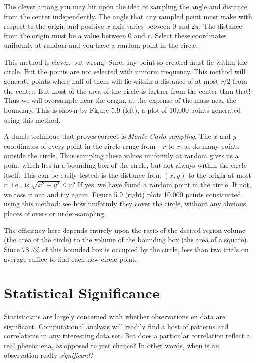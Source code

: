 \documentclass[10pt]{article}
\begin{document}
The clever among you may hit upon the idea of sampling the angle and distance from the center independently. The angle that any sampled point must make with respect to the origin and positive $x$-axis varies between 0 and $2 \pi$. The distance from the origin must be a value between 0 and $r$. Select these coordinates uniformly at random and you have a random point in the circle.

This method is clever, but wrong. Sure, any point so created must lie within the circle. But the points are not selected with uniform frequency. This method will generate points where half of them will lie within a distance of at most $r / 2$ from the center. But most of the area of the circle is farther from the center than that! Thus we will oversample near the origin, at the expense of the mass near the boundary. This is shown by Figure 5.9 (left), a plot of 10,000 points generated using this method.

A dumb technique that proves correct is \textit{Monte Carlo sampling}. The $x$ and $y$ coordinates of every point in the circle range from $-r$ to $r$, as do many points outside the circle. Thus sampling these values uniformly at random gives us a point which lies in a bounding box of the circle, but not always within the circle itself. This can be easily tested: is the distance from $(x, y)$ to the origin at most $r$, i.e., is $\sqrt{x^{2}+y^{2}} \leq r$? If yes, we have found a random point in the circle. If not, we toss it out and try again. Figure 5.9 (right) plots 10,000 points constructed using this method: see how uniformly they cover the circle, without any obvious places of over- or under-sampling.

The efficiency here depends entirely upon the ratio of the desired region volume (the area of the circle) to the volume of the bounding box (the area of a square). Since $78.5 \%$ of this bounded box is occupied by the circle, less than two trials on average suffice to find each new circle point.

\section{Statistical Significance}
Statisticians are largely concerned with whether observations on data are significant. Computational analysis will readily find a host of patterns and correlations in any interesting data set. But does a particular correlation reflect a real phenomena, as opposed to just chance? In other words, when is an observation really \textit{significant}?
\end{document}
